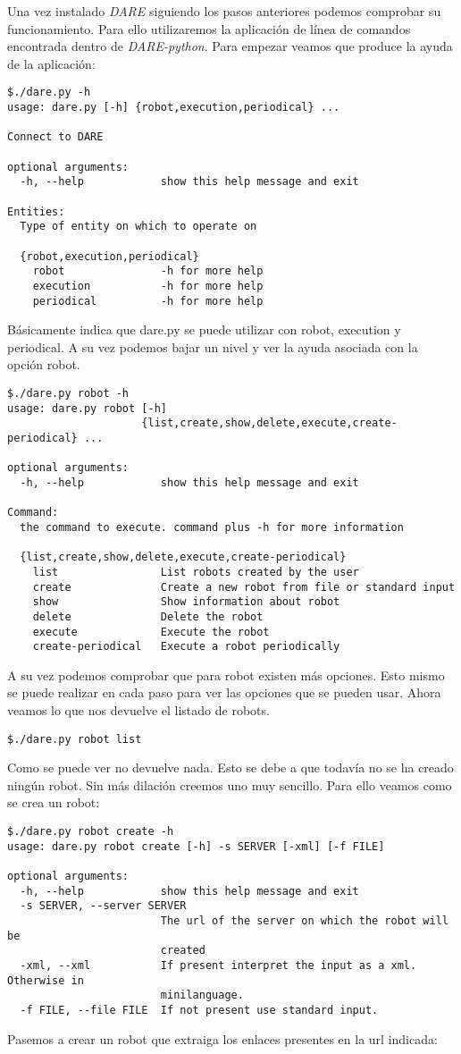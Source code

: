 Una vez instalado \emph{DARE} siguiendo los pasos anteriores podemos
comprobar su funcionamiento. Para ello utilizaremos la aplicación de
línea de comandos encontrada dentro de \emph{DARE-python}. Para
empezar veamos que produce la ayuda de la aplicación:

\begin{verbatim}
$./dare.py -h
usage: dare.py [-h] {robot,execution,periodical} ...

Connect to DARE

optional arguments:
  -h, --help            show this help message and exit

Entities:
  Type of entity on which to operate on

  {robot,execution,periodical}
    robot               -h for more help
    execution           -h for more help
    periodical          -h for more help
\end{verbatim}

Básicamente indica que dare.py se puede utilizar con robot, execution
y periodical. A su vez podemos bajar un nivel y ver la ayuda asociada
con la opción robot.
\begin{verbatim}
$./dare.py robot -h
usage: dare.py robot [-h]
                     {list,create,show,delete,execute,create-periodical} ...

optional arguments:
  -h, --help            show this help message and exit

Command:
  the command to execute. command plus -h for more information

  {list,create,show,delete,execute,create-periodical}
    list                List robots created by the user
    create              Create a new robot from file or standard input
    show                Show information about robot
    delete              Delete the robot
    execute             Execute the robot
    create-periodical   Execute a robot periodically

\end{verbatim}

A su vez podemos comprobar que para robot existen más opciones. Esto
mismo se puede realizar en cada paso para ver las opciones que se
pueden usar. Ahora veamos lo que nos devuelve el listado de robots.
\begin{verbatim}
$./dare.py robot list
\end{verbatim}
Como se puede ver no devuelve nada. Esto se debe a que todavía no
se ha creado ningún robot. Sin más dilación creemos uno muy
sencillo. Para ello veamos como se crea un robot:
\begin{verbatim}
$./dare.py robot create -h
usage: dare.py robot create [-h] -s SERVER [-xml] [-f FILE]

optional arguments:
  -h, --help            show this help message and exit
  -s SERVER, --server SERVER
                        The url of the server on which the robot will be
                        created
  -xml, --xml           If present interpret the input as a xml. Otherwise in
                        minilanguage.
  -f FILE, --file FILE  If not present use standard input.
\end{verbatim}
Pasemos a crear un robot que extraiga los enlaces presentes en la
url indicada:

